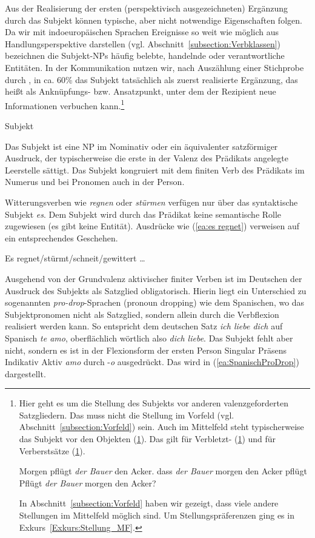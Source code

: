 Aus der Realisierung der ersten (perspektivisch ausgezeichneten) Ergänzung durch das Subjekt können typische, aber nicht notwendige Eigenschaften folgen. Da wir mit indoeuropäischen Sprachen Ereignisse so weit wie möglich aus Handlungsperspektive darstellen (vgl. Abschnitt~\ref{subsection:Verbklassen}) bezeichnen die Subjekt-NPs häufig belebte, handelnde oder verantwortliche Entitäten. In der Kommunikation nutzen wir, nach Auszählung einer Stichprobe durch \citet[44]{Engel1972}, in ca. 60\% das Subjekt tatsächlich als zuerst realisierte Ergänzung, das heißt als Anknüpfungs- bzw. Ansatzpunkt, unter dem der Rezipient neue Informationen verbuchen kann.\footnote{Hier geht es um die Stellung des Subjekts vor anderen valenzgeforderten Satzgliedern. Das muss nicht die Stellung im Vorfeld (vgl. Abschnitt~\ref{subsection:Vorfeld}) sein. Auch im Mittelfeld steht typischerweise das Subjekt vor den Objekten (\ref{ea:Subj_1_MF}). Das gilt für Verbletzt- (\ref{ex:Subj_Vend}) und für Verberstsätze (\ref{ex:Subj_Verst}). 

\ea \label{ea:Subj_1_MF} Morgen pflügt \textit{der Bauer} den Acker.
\ex \label{ex:Subj_Vend} dass \textit{der Bauer} morgen den Acker pflügt
\ex \label{ex:Subj_Verst} Pflügt \textit{der Bauer} morgen den Acker? 
\z

In Abschnitt~\ref{subsection:Vorfeld} haben wir gezeigt, dass viele andere Stellungen im Mittelfeld möglich sind. Um Stellungspräferenzen ging es in Exkurs~\ref{Exkurs:Stellung_MF}.}


\begin{Definition}{Subjekt}
    
\noindent \noindent Das Subjekt ist eine NP im Nominativ oder ein äquivalenter satzförmiger Ausdruck, der typischerweise die erste in der Valenz des Prädikats angelegte Leerstelle sättigt. Das Subjekt kongruiert mit dem finiten Verb des Prädikats im Numerus und bei Pronomen auch in der Person.   
\end{Definition}


Witterungsverben wie \textit{regnen} oder \textit{stürmen} verfügen nur über das syntaktische Subjekt \textit{es}. Dem Subjekt wird durch das Prädikat keine semantische Rolle zugewiesen (es gibt keine  Entität). Ausdrücke wie (\ref{ea:es regnet}) verweisen auf ein entsprechendes Geschehen.

\ea \label{ea:es regnet} Es regnet/stürmt/schneit/gewittert \ldots{} 
\z 

Ausgehend von der Grundvalenz aktivischer finiter Verben ist im Deutschen der Ausdruck des Subjekts als Satzglied obligatorisch. Hierin liegt ein Unterschied zu sogenannten \textit{pro-drop}-Sprachen (pronoun dropping) wie \zB dem Spanischen, wo das Subjektpronomen nicht als Satzglied, sondern allein durch die Verbflexion realisiert werden kann. So entspricht dem deutschen Satz \textit{ich liebe dich} auf Spanisch \textit{te amo}, oberflächlich wörtlich also \textit{dich liebe}. Das Subjekt fehlt aber nicht, sondern es ist in der Flexionsform der ersten Person Singular Präsens Indikativ Aktiv \textit{amo} durch -\textit{o} ausgedrückt. Das wird in (\ref{ea:SpanischProDrop}) dargestellt.


